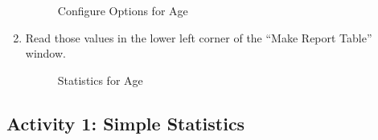\begin{enumerate}
  \begin{figure}[H]
      \begin{center}
          \caption{Configure Options for Age}
      \end{center}
  \end{figure}
    
  \item Read those values in the lower left corner of the ``Make Report Table'' window.

  \begin{figure}[H]
    \begin{center}
      \caption{Statistics for Age}
    \end{center}
  \end{figure}
  
\end{enumerate}

\subsection{Activity 1: Simple Statistics} \label{dis:act01}

